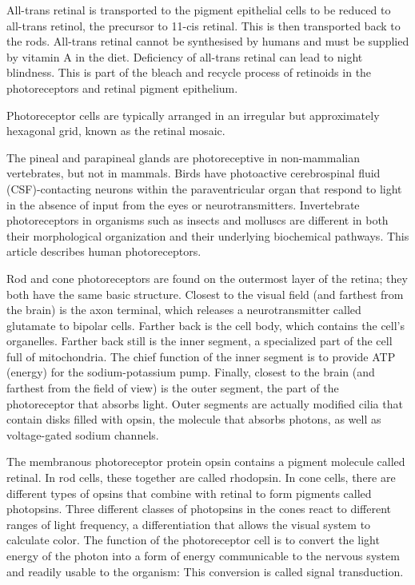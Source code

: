 \documentclass[]{book}
\begin{document}
All-trans retinal is transported to the pigment epithelial cells to be reduced to all-trans retinol, the precursor to 11-cis retinal. This is then transported back to the rods. All-trans retinal cannot be synthesised by humans and must be supplied by vitamin A in the diet. Deficiency of all-trans retinal can lead to night blindness. This is part of the bleach and recycle process of retinoids in the photoreceptors and retinal pigment epithelium.

Photoreceptor cells are typically arranged in an irregular but approximately hexagonal grid, known as the retinal mosaic.

The pineal and parapineal glands are photoreceptive in non-mammalian vertebrates, but not in mammals. Birds have photoactive cerebrospinal fluid (CSF)-contacting neurons within the paraventricular organ that respond to light in the absence of input from the eyes or neurotransmitters. Invertebrate photoreceptors in organisms such as insects and molluscs are different in both their morphological organization and their underlying biochemical pathways. This article describes human photoreceptors.

Rod and cone photoreceptors are found on the outermost layer of the retina; they both have the same basic structure. Closest to the visual field (and farthest from the brain) is the axon terminal, which releases a neurotransmitter called glutamate to bipolar cells. Farther back is the cell body, which contains the cell's organelles. Farther back still is the inner segment, a specialized part of the cell full of mitochondria. The chief function of the inner segment is to provide ATP (energy) for the sodium-potassium pump. Finally, closest to the brain (and farthest from the field of view) is the outer segment, the part of the photoreceptor that absorbs light. Outer segments are actually modified cilia that contain disks filled with opsin, the molecule that absorbs photons, as well as voltage-gated sodium channels.

The membranous photoreceptor protein opsin contains a pigment molecule called retinal. In rod cells, these together are called rhodopsin. In cone cells, there are different types of opsins that combine with retinal to form pigments called photopsins. Three different classes of photopsins in the cones react to different ranges of light frequency, a differentiation that allows the visual system to calculate color. The function of the photoreceptor cell is to convert the light energy of the photon into a form of energy communicable to the nervous system and readily usable to the organism: This conversion is called signal transduction.
\end{document}
